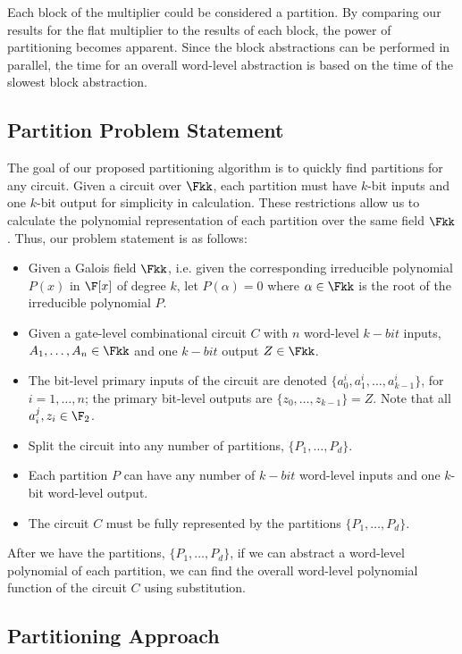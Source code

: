 Each block of the multiplier could be considered a partition. By 
comparing our results for the flat multiplier to the results of each 
block, the power of partitioning becomes apparent. Since the block 
abstractions can be performed in parallel, the time for an 
overall word-level abstraction is based on the time of the slowest block
abstraction.

\subsection{Partition Problem Statement}

The goal of our proposed partitioning algorithm 
is to quickly find partitions for any circuit. 
Given a circuit over $\Fkk$, each partition must have $k$-bit inputs and 
one $k$-bit output for simplicity in calculation.
These restrictions allow us to calculate the polynomial representation of 
each partition over the same field $\Fkk$. Thus, our problem statement is
as follows:

\begin{itemize}
\item Given a Galois field $\Fkk$, i.e. given the corresponding
irreducible polynomial $P(x)$ in $\F[x]$ of degree $k$,
let $P(\alpha) = 0$ where $\alpha \in \Fkk$ is the root of the irreducible
polynomial $P$.
\item  Given a gate-level combinational circuit $C$ with $n$ word-level
$k-bit$ inputs,
$A_1,\dots, A_n \in \Fkk$
and one $k-bit$ output $Z \in \Fkk$.
\item The bit-level primary inputs of the circuit are denoted
$\{a_{0}^{i},a_{1}^{i},\dots,a_{k-1}^{i}\}$, for $i=1,\dots, n$;
the primary bit-level outputs are $\{z_0, \dots, z_{k-1}\} = Z$. 
Note that all $a_{i}^{j}, z_i \in \F_2$.
\item Split the circuit into any number of partitions, $\{P_1,\dots,P_d\}$.
\item Each partition $P$ can have any number of $k-bit$ word-level inputs and
one $k$-bit word-level output.
\item The circuit $C$ must be fully represented by the partitions 
$\{P_1,\dots,P_d\}$.
\end{itemize}

After we have the partitions, $\{P_1,\dots,P_d\}$, if we can abstract a 
word-level polynomial of each partition, we can find the overall word-level 
polynomial function of the circuit $C$ using substitution.

\subsection{Partitioning Approach}


